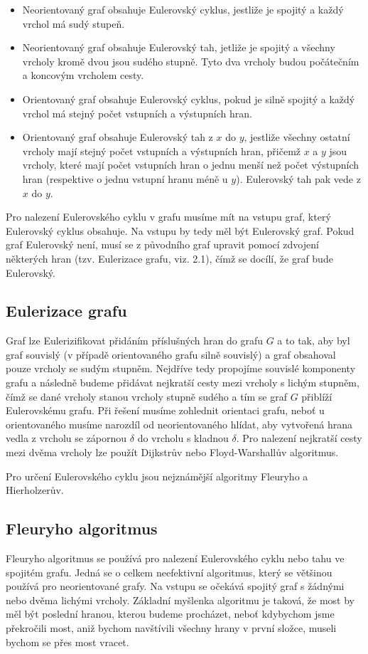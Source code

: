 \documentclass[12pt]{article}
\begin{document}
\begin{itemize}
  \item Neorientovaný graf obsahuje Eulerovský cyklus, jestliže je spojitý a každý vrchol má sudý stupeň.
  \item Neorientovaný graf obsahuje Eulerovský tah, jetliže je spojitý a všechny vrcholy kromě dvou jsou sudého stupně. Tyto dva vrcholy budou počátečním a koncovým vrcholem cesty. 
  \item Orientovaný graf obsahuje Eulerovský cyklus, pokud je silně spojitý a každý vrchol má stejný počet vstupních a výstupních hran.
  \item Orientovaný graf obsahuje Eulerovský tah z $x$ do $y$, jestliže všechny ostatní vrcholy mají stejný počet vstupních a výstupních hran, přičemž $x$ a $y$ jsou vrcholy, které mají počet vstupních hran o jednu menší než počet výstupních hran (respektive o jednu vstupní hranu méně u $y$). Eulerovský tah pak vede z $x$ do $y$.
\end{itemize}
Pro nalezení Eulerovského cyklu v grafu musíme mít na vstupu graf, který Eulerovský cyklus obsahuje. Na vstupu by tedy měl být Eulerovský graf. Pokud graf Eulerovský není, musí se z původního graf upravit pomocí zdvojení některých hran (tzv. Eulerizace grafu, viz. 2.1), čímž se docílí, že graf bude Eulerovský.

\subsection{Eulerizace grafu}
\label{s:1}
Graf lze Eulerizifikovat přidáním příslušných hran do grafu $G$ a to tak, aby byl graf souvislý (v případě orientovaného grafu silně souvislý) a graf obsahoval pouze vrcholy se sudým stupněm. Nejdříve tedy propojíme souvislé komponenty grafu a následně budeme přidávat nejkratší cesty mezi vrcholy s lichým stupněm, čímž se dané vrcholy stanou vrcholy stupně sudého a tím se graf $G$ přiblíží Eulerovskému grafu. Při řešení musíme zohlednit orientaci grafu, neboť u orientovaného musíme narozdíl od neorientovaného hlídat, aby vytvořená hrana vedla z vrcholu se zápornou $\delta$ do vrcholu s kladnou $\delta$. Pro nalezení nejkratší cesty mezi dvěma vrcholy lze použít Dijkstrův nebo Floyd-Warshallův algoritmus.
\newpage 

\noindent Pro určení Eulerovského cyklu jsou nejznámější algoritmy Fleuryho a Hierholzerův.
\subsection{Fleuryho algoritmus}
Fleuryho algoritmus \cite{stachnikproblem, Eulerian, Fleury} se používá pro nalezení Eulerovského cyklu nebo tahu ve spojitém grafu. Jedná se o celkem neefektivní algoritmus, který se většinou používá pro neorientované grafy. Na vstupu se očekává spojitý graf s žádnými nebo dvěma lichými vrcholy. Základní myšlenka algoritmu je taková, že most by měl být poslední hranou, kterou budeme procházet, neboť kdybychom jsme překročili most, aniž bychom navštívili všechny hrany v první složce, museli bychom se přes most vracet. 
\end{document}
